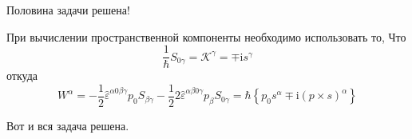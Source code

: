 \documentclass[a4paper,12pt]{article} %
\begin{document}
\begin{ttask}
Половина задачи решена!




При вычислении пространственной компоненты необходимо использовать то,
Что
$$
\frac{1}{\hbar} S_{0 \gamma}=\mathcal{K}^{\gamma}=\mp \mathrm{i} s^{\gamma}
$$
откуда
$$
W^{\alpha}=-\frac{1}{2} \hat{\varepsilon}^{\alpha 0 \beta \gamma} p_{0} S_{\beta \gamma}-\frac{1}{2} 2 \hat{\varepsilon}^{\alpha \beta 0 \gamma} p_{\beta} S_{0 \gamma}=\hbar\left\{p_{0} s^{\alpha} \mp \mathrm{i}(p \times s)^{\alpha}\right\}
$$



Вот и вся задача решена.




















\end{ttask}
\end{document}

